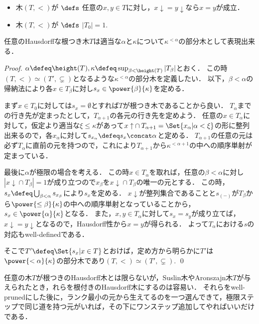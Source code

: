 \documentclass[a4j]{ltjsarticle}
\renewcommand{\emph}[1]{\textsf{\textgt{#1}}}
\begin{document}
\begin{definition}
 \begin{itemize}
  \item 木$(T, <)$が\emph{Hausdorff} $\defs$ 任意の$x, y \in T$に対し，$\mathord{x\downarrow} = \mathord{y \downarrow}$なら$x = y$が成立．
  \item 木$(T, <)$が\emph{根つき木} $\defs$ $|T_0| = 1$.
 \end{itemize}
\end{definition}
\begin{lemma}
 任意のHausdorffな根つき木$T$は適当な$\alpha$と$\kappa$について$\kappa^{<\alpha}$の部分木として表現出来る．
\end{lemma}
\begin{proof}
 $\alpha \defeq \height(T), \kappa \defeq \sup_{\beta < \height(T)} |T_\beta|$とおく．
 この時$(T, <) \simeq (T', \subsetneq)$となるような$\kappa^{<\alpha}$の部分木を定義したい．
 以下，$\beta < \alpha$の帰納法により各$x \in T_\beta$に対し$s_x \in \power{\beta}{\kappa}$を定める．

 まず$x \in T_0$に対しては$s_x = \emptyset$とすれば$T$が根つき木であることから良い．
 $T_\alpha$までの行き先が定まったとして，$T_{\alpha+1}$の各元の行き先を定めよう．
 任意の$x \in T_{\alpha}$に対して，仮定より適当な$\xi \leq \kappa$があって$\mathord{x \uparrow} \cap T_{\alpha+1} = \Set{ x_\alpha | \alpha < \xi}$の形に整列出来るので，各$x_\alpha$に対して$s_{x_\alpha} \defeq s_x \concat \alpha$と定める．
 $T_{\alpha+1}$の任意の元は必ず$T_\alpha$に直前の元を持つので，これにより$T_{\alpha+1}$から$\kappa^{<\alpha+1}$の中への順序単射が定まっている．

 最後に$\alpha$が極限の場合を考える．
 この時$x \in T_\alpha$を取れば，任意の$\beta < \alpha$に対し$|\mathord{x \downarrow} \cap T_\beta| = 1$が成り立つので$x_\beta$を$\mathord{x \downarrow} \cap T_\beta$の唯一の元とする．
 この時，$s_x \defeq \bigcup_{\beta < \alpha} s_{x_\beta}$により$s_x$を定める．
 $x\downarrow$が整列集合であることと$s_{(-)}$が$T_\beta$から$\power{\leq\beta}{\kappa}$の中への順序単射となっていることから，$s_x \in \power{\alpha}{\kappa}$となる．
 また，$x, y \in T_\alpha$に対して$s_x = s_y$が成り立てば，$\mathord{x \downarrow} = \mathord{y \downarrow}$となるので，Hausdorff性から$x = y$が得られる．
 よって$T_\alpha$における$s$の対応もwell-definedである．

 そこで$T' \defeq \Set{ s_x | x \in T}$とおけば，定め方から明らかに$T'$は$\power{<\alpha}{\kappa}$の部分木であり$(T, <) \simeq (T', \subsetneq)$. \qed
\end{proof}

任意の木$T$が根つきのHausdorff木とは限らないが，Suslin木やAronszajn木$T$が与えられたとき，れらを根付きのHausdorff木にするのは容易い．
それらをwell-prunedにした後に，ランク最小の元から生えてるのを一つ選んできて，極限ステップで同じ道を持つ元がいれば，その下にワンステップ追加してやればいいだけである．

\nocite{Shelah:1984,Kunen:1980,Jech:2002}
\nocite{Bekkali:1991bv,Miyazaki:2013fv,Kunen:2011}
\printbibliography[title=参考文献]
\end{document}
